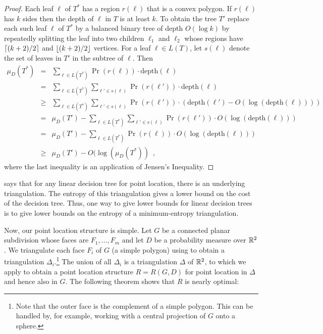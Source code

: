 \documentclass[lotsofwhite]{patmorin}
\newcommand{\depth}{\mathrm{depth}}
\begin{document}
\begin{proof}
Each leaf $\ell$ of $T^*$ has a region $r(\ell)$ that is a convex
polygon.  If $r(\ell)$ has $k$ sides then the depth of $\ell$ in $T$
is at least $k$.  To obtain the tree $T'$ replace each such leaf
$\ell$ of $T^*$ by a balanced binary tree of depth $O(\log k)$ by
repeatedly splitting the leaf into two children $\ell_1$ and $\ell_2$
whose regions have $\left\lceil (k+2)/2 \right\rceil$ and $\left\lfloor (k+2)/2 \right\rfloor$ vertices.
For a leaf $\ell\in L(T)$, let $s(\ell)$ denote the set of leaves in $T'$
in the subtree of $\ell$.   Then
\begin{eqnarray*}
   \mu_D(T^*) 
     &  =  & \sum_{\ell\in L(T^*)} \Pr(r(\ell))\cdot \depth(\ell) \\
     &  =  & \sum_{\ell\in L(T^*)}\sum_{\ell'\in s(\ell)} 
              \Pr(r(\ell'))\cdot \depth(\ell) \\
     & \ge & \sum_{\ell\in L(T^*)} 
             \sum_{\ell'\in s(\ell)}\Pr(r(\ell'))\cdot (\depth(\ell')
                   - O(\log (\depth(\ell)))) \\
     &  =  & \mu_D(T') - \sum_{\ell\in L(T^*)} 
             \sum_{\ell'\in s(\ell)}\Pr(r(\ell'))\cdot O(\log (\depth(\ell))) \\
     &  =  & \mu_D(T') - \sum_{\ell\in L(T^*)} 
             \Pr(r(\ell))\cdot O(\log (\depth(\ell))) \\
     & \ge & \mu_D(T') - O(\log(\mu_D(T^*)) \enspace , 
\end{eqnarray*}
where the last inequality is an application of Jensen's Inequality.
\end{proof}

 says that for any linear decision tree for point
location, there is an underlying triangulation.  The entropy of this
triangulation gives a lower bound on the cost of the decision tree.
Thus, one way to give lower bounds for linear decision trees is to
give lower bounds on the entropy of a minimum-entropy triangulation.

Now, our point location structure is simple.  Let $G$ be a connected
planar subdivision whose faces are $F_1,\ldots,F_m$ and let $D$ be a
probability measure over $\mathbb{R}^2$.  We triangulate each face $F_i$ of
$G$ (a simple polygon) using  to obtain a
triangulation $\Delta_i$.\footnote{Note that the outer face is the
complement of a simple polygon.  This can be handled by, for example,
working with a central projection of $G$ onto a sphere.} The union of
all $\Delta_i$ is a triangulation $\Delta$ of $\mathbb{R}^2$, to which we
apply  to obtain a point location structure $R=R(G,D)$
for point location in $\Delta$ and hence also in $G$.  The following
theorem shows that $R$ is nearly optimal:
\end{document}

